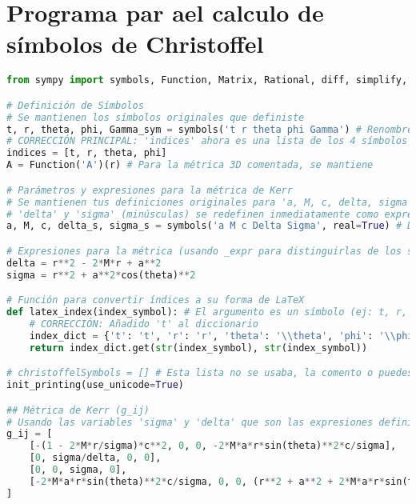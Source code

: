 \appendix
\chapter{Programa par ael calculo de símbolos de  Christoffel}

\begin{lstlisting}[language=Python, caption=Python example]
from sympy import symbols, Function, Matrix, Rational, diff, simplify, latex, init_printing, sin, cos

# Definición de Símbolos
# Se mantienen los símbolos originales que definiste
t, r, theta, phi, Gamma_sym = symbols('t r theta phi Gamma') # Renombré 'Gamma' a 'Gamma_sym' para evitar confusión con el nombre de la función Christoffel, aunque en tu código original no causaba error.
# CORRECCIÓN PRINCIPAL: 'indices' ahora es una lista de los 4 símbolos de coordenadas
indices = [t, r, theta, phi] 
A = Function('A')(r) # Para la métrica 3D comentada, se mantiene

# Parámetros y expresiones para la métrica de Kerr
# Se mantienen tus definiciones originales para 'a, M, c, delta, sigma' como símbolos.
# 'delta' y 'sigma' (minúsculas) se redefinen inmediatamente como expresiones.
a, M, c, delta_s, sigma_s = symbols('a M c Delta Sigma', real=True) # Delta y Sigma (mayúsculas) son símbolos, delta y sigma (minúsculas) se definen abajo

# Expresiones para la métrica (usando _expr para distinguirlas de los símbolos si fuera necesario)
delta = r**2 - 2*M*r + a**2
sigma = r**2 + a**2*cos(theta)**2

# Función para convertir índices a su forma de LaTeX
def latex_index(index_symbol): # El argumento es un símbolo (ej: t, r, theta, phi)
    # CORRECCIÓN: Añadido 't' al diccionario
    index_dict = {'t': 't', 'r': 'r', 'theta': '\\theta', 'phi': '\\phi'}
    return index_dict.get(str(index_symbol), str(index_symbol))

# christoffelSymbols = [] # Esta lista no se usaba, la comento o puedes eliminarla.
init_printing(use_unicode=True)

## Métrica de Kerr (g_ij)
# Usando las variables 'sigma' y 'delta' que son las expresiones definidas arriba
g_ij = [
    [-(1 - 2*M*r/sigma)*c**2, 0, 0, -2*M*a*r*sin(theta)**2*c/sigma],
    [0, sigma/delta, 0, 0],
    [0, 0, sigma, 0],
    [-2*M*a*r*sin(theta)**2*c/sigma, 0, 0, (r**2 + a**2 + 2*M*a*r*sin(theta)**2/sigma)*sin(theta)**2]
]


\end{lstlisting}
